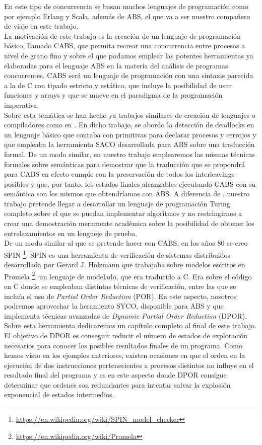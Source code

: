 En este tipo de concurrencia se basan muchos lenguajes de programación como por ejemplo Erlang y Scala, además de ABS, el que va a ser nuestro compañero de viaje en este trabajo.\\

La motivación de este trabajo es la creación de un lenguaje de programación básico, llamado CABS, que permita recrear una concurrencia entre procesos a nivel de grano fino y sobre el que podamos emplear las potentes herramientas ya elaboradas para el lenguaje ABS en la materia del análisis de programas concurrentes. CABS será un lenguaje de programación con una sintaxis parecida a la de C con tipado estricto y estático, que incluye la posibilidad de usar funciones y arrays y que se mueve en el paradigma de la programación imperativa.\\

Sobre esta temática se han hecho ya trabajos similares de creación de lenguajes o compiladores como en \cite{Alicia}. En dicho trabajo, se abordo la detección de deadlocks en un lenguaje básico que contaba con primitivas para declarar procesos y cerrojos y que empleaba la herramienta SACO desarrollada para ABS sobre una traducción formal. De un modo similar, en nuestro trabajo emplearemos las mismas técnicas formales sobre semánticas para demostrar que la traducción que se propondrá para CABS en efecto cumple con la preservación de todos los interleavings posibles y que, por tanto, los estados finales alcanzables ejecutando CABS con su semántica son los mismos que obtendríamos con ABS. A diferencia de \cite{Alicia}, nuestro trabajo pretende llegar a desarrollar un lenguaje de programación Turing completo sobre el que se puedan implementar algoritmos y no restringirnos a crear una demostración meramente académica sobre la posibilidad de obtener los entrelazamientos en un lengueje de prueba.\\

De un modo similar al que se pretende hacer con CABS, en los años 80 se creo SPIN \footnote{\url{https://en.wikipedia.org/wiki/SPIN_model_checker}}. SPIN es una herramienta de verificación de sistemas distribuidos desarrollada por Gerard J. Holzmann que trabajaba sobre modelos escritos en Promela \footnote{\url{https://en.wikipedia.org/wiki/Promela}}, un lenguaje de modelado, que era traducido a C. Era sobre el código en C donde se empleaban distintas técnicas de verificación, entre las que se incluía el uso de \emph{Partial Order Reduction} (POR). En este aspecto, nosotros podremos aprovechar la heramiento SYCO, disponible para ABS y que implementa técnicas avanzadas de \emph{Dynamic Partial Order Reduction} (DPOR). Sobre esta herramienta dedicaremos un capítulo completo al final de este trabajo. El objetivo de DPOR es conseguir reducir el número de estados de exploración necesarios para conocer los posibles resultados finales de un programa. Como hemos visto en los ejemplos anteriores, existen ocasiones en que el orden en la ejecución de dos instrucciones pertenecientes a procesos distintos no influye en el resultado final del programa y es en este aspecto donde DPOR consigue determinar que ordenes son redundantes para intentar salvar la explosión exponencial de estados intermedios.\\

